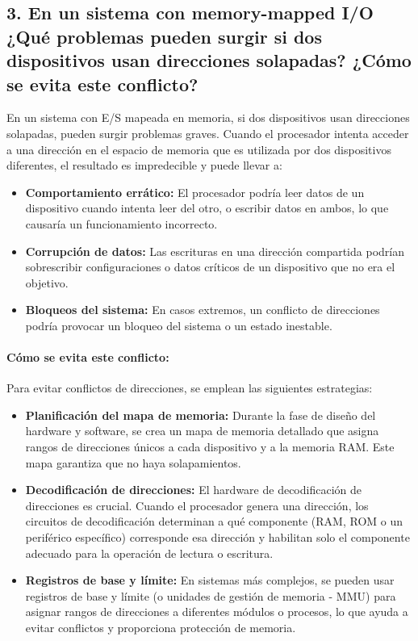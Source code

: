 \documentclass[12pt]{article}
\begin{document}
\subsection*{3. En un sistema con memory-mapped I/O ¿Qué problemas pueden surgir si dos dispositivos usan direcciones solapadas? ¿Cómo se evita este conflicto?}

En un sistema con E/S mapeada en memoria, si dos dispositivos usan direcciones solapadas, pueden surgir problemas graves. Cuando el procesador intenta acceder a una dirección en el espacio de memoria que es utilizada por dos dispositivos diferentes, el resultado es impredecible y puede llevar a:
\begin{itemize}
    \item \textbf{Comportamiento errático:} El procesador podría leer datos de un dispositivo cuando intenta leer del otro, o escribir datos en ambos, lo que causaría un funcionamiento incorrecto.
    \item \textbf{Corrupción de datos:} Las escrituras en una dirección compartida podrían sobrescribir configuraciones o datos críticos de un dispositivo que no era el objetivo.
    \item \textbf{Bloqueos del sistema:} En casos extremos, un conflicto de direcciones podría provocar un bloqueo del sistema o un estado inestable.
\end{itemize}

\paragraph{Cómo se evita este conflicto:}
Para evitar conflictos de direcciones, se emplean las siguientes estrategias:
\begin{itemize}
    \item \textbf{Planificación del mapa de memoria:} Durante la fase de diseño del hardware y software, se crea un mapa de memoria detallado que asigna rangos de direcciones únicos a cada dispositivo y a la memoria RAM. Este mapa garantiza que no haya solapamientos.
    \item \textbf{Decodificación de direcciones:} El hardware de decodificación de direcciones es crucial. Cuando el procesador genera una dirección, los circuitos de decodificación determinan a qué componente (RAM, ROM o un periférico específico) corresponde esa dirección y habilitan solo el componente adecuado para la operación de lectura o escritura.
    \item \textbf{Registros de base y límite:} En sistemas más complejos, se pueden usar registros de base y límite (o unidades de gestión de memoria - MMU) para asignar rangos de direcciones a diferentes módulos o procesos, lo que ayuda a evitar conflictos y proporciona protección de memoria.
\end{itemize}
\end{document}
